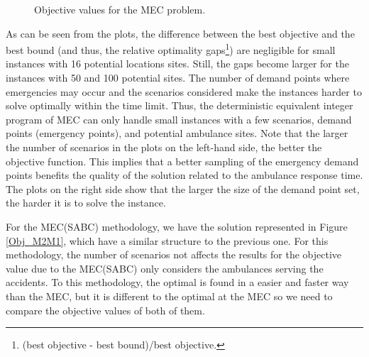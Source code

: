 \begin{figure}[H]
\hspace{0.4cm}%
\vspace{0.4cm}
\caption{Objective values for the MEC problem.}
\label{Obj_MEC}
\end{figure}

As can be seen from the plots, the difference between the best objective and the best bound (and thus, the relative optimality gaps\footnote{(best objective -  best bound)/best objective.}) are negligible for small instances with 16 potential locations sites. Still, the gaps become larger for the instances with 50 and 100 potential sites. The number of demand points where emergencies may occur and the scenarios considered make the instances harder to solve optimally within the time limit. Thus, the deterministic equivalent integer program of MEC can only handle small instances with a few scenarios, demand points (emergency points), and potential ambulance sites. Note that the larger the number of scenarios in the plots on the left-hand side, the better the objective function. This implies that a better sampling of the emergency demand points benefits the quality of the solution related to the ambulance response time. The plots on the right side show that the larger the size of the demand point set, the harder it is to solve the instance. 

   

For the MEC(SABC) methodology, we have the solution represented in Figure \ref{Obj_M2M1}, which have a similar structure to the previous one. For this methodology, the number of scenarios not affects the results for the objective value due to the MEC(SABC) only considers the ambulances serving the accidents. To this methodology, the optimal is found in a easier and faster way than the MEC, but it is different to the optimal at the MEC so we need to compare the objective values of both of them. 

